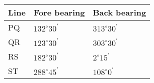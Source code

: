 \begin{center}
\begin{tabular}{|l|l|l|}
\hline
\textbf{Line} & \textbf{Fore bearing} & \textbf{Back bearing} \\ \hline
PQ & $132^{\circ}30^{\prime}$ & $313^{\circ}30^{\prime}$ \\ \hline
QR & $123^{\circ}30^{\prime}$ & $303^{\circ}30^{\prime}$ \\ \hline
RS & $182^{\circ}30^{\prime}$ & $2^{\circ}15^{\prime}$ \\ \hline
ST & $288^{\circ}45^{\prime}$ & $108^{\circ}0^{\prime}$ \\ \hline
\end{tabular}
\end{center}